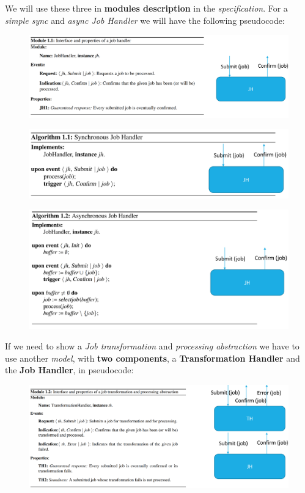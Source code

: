 \documentclass{article}
\begin{document}
We will use these three in \textbf{modules description} in the \emph{specification}. For a \emph{simple sync} and \emph{async Job Handler} we will have the following pseudocode:
\begin{figure}[H]
  \centering
  \includegraphics[scale=0.55, left]{cattura1.png}
\end{figure}
\begin{figure}[H]
  \centering
  \includegraphics[scale=0.55, left]{cattura2.png}
\end{figure}
\begin{figure}[H]
  \centering
  \includegraphics[scale=0.55, left]{cattura3.png}
\end{figure}
\hfill \break
If we need to show a \emph{Job transformation} and \emph{processing abstraction} we have to use another \emph{model}, with \textbf{two components}, a \textbf{Transformation Handler} and the \textbf{Job Handler}, in pseudocode: 
\begin{figure}[H]
  \centering
  \includegraphics[scale=0.48, left]{cattura4.png}
\end{figure}
\end{document}

